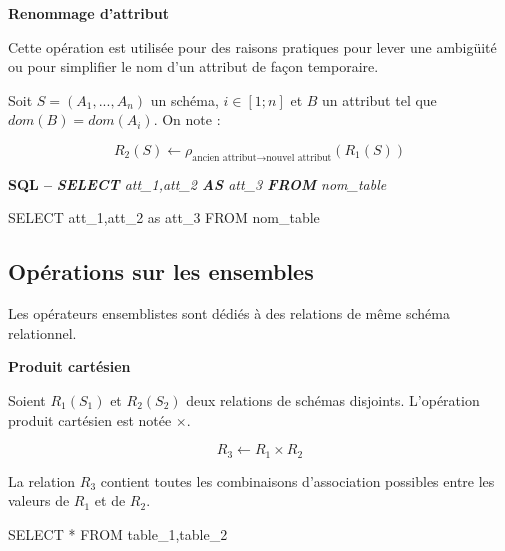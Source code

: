 \documentclass[10pt,fleqn]{article} %
\begin{document}
\begin{defi}
\textbf{Renommage d'attribut}

Cette opération est utilisée pour des raisons pratiques pour lever une ambigüité ou pour simplifier le nom d'un attribut de façon temporaire. 

Soit $S = (A_1,... ,A_n)$ un schéma, $ i \in[1;n]$ et $B$ un attribut tel que
$dom(B) = dom(A_i)$. On note :

\vspace{1cm}
\begin{minipage}[c]{.47\linewidth}
$$
R_2 (S)\leftarrow \rho_{\text{ancien attribut} \rightarrow \text{nouvel attribut}}(R_1(S))
$$
\end{minipage}\hfill
\begin{minipage}[c]{.47\linewidth}
\textbf{SQL -- } \textsl{\textbf{SELECT} att\_1,att\_2 \textbf{AS} att\_3 \textbf{FROM} nom\_table}
\begin{sql}
SELECT att_1,att_2 as att_3 FROM nom_table
\end{sql}
\end{minipage}

\end{defi}






\subsection*{Opérations sur les ensembles}
\begin{rem}
Les opérateurs ensemblistes sont dédiés à des relations de même schéma relationnel. 
\end{rem}


\begin{defi}

\textbf{Produit cartésien}

Soient $R_1(S_1)$ et $R_2(S_2)$ deux relations de schémas disjoints. L'opération produit cartésien est notée $\times$. 

$$
R_3 \leftarrow R_1 \times R_2
$$

La relation $R_3$ contient toutes les combinaisons d'association possibles entre les valeurs de $R_1$ et de $R_2$.

\end{defi}
\begin{envsql}
\begin{sql}
SELECT * FROM table_1,table_2
\end{sql}
\end{envsql}
\end{document}
